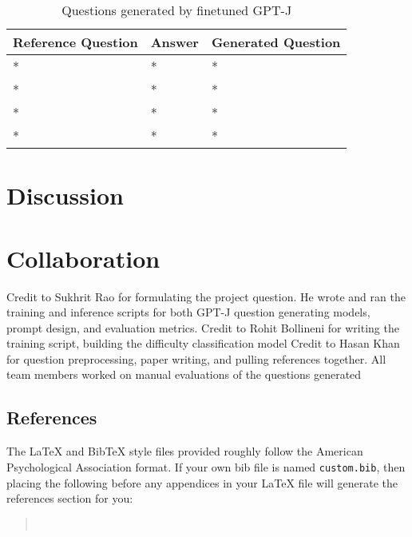 \documentclass[11pt]{article}
\begin{document}
\begin{table*}
\centering
\begin{tabular}{lll}
\hline
\textbf{Reference Question} & \textbf{Answer} & \textbf{Generated Question}\\
\hline
* & * & * \\
\hline
* & * & * \\
\hline
* & * & * \\
\hline
* & * & * \\
\hline
\end{tabular}
\caption{\label{citation-guide}
Questions generated by finetuned GPT-J 
}
\end{table*}

\section{Discussion}

\section{Collaboration}
Credit to Sukhrit Rao for formulating the project question. He wrote and ran the training and inference scripts for both GPT-J question generating models, prompt design, and evaluation metrics.
Credit to Rohit Bollineni for writing the training script, building the difficulty classification model
Credit to Hasan Khan for question preprocessing, paper writing, and pulling references together. All team members worked on manual evaluations of the questions generated 



\subsection{References}

\nocite{Ando2005,borschinger-johnson-2011-particle,andrew2007scalable,rasooli-tetrault-2015,goodman-etal-2016-noise,harper-2014-learning}

The \LaTeX{} and Bib\TeX{} style files provided roughly follow the American Psychological Association format.
If your own bib file is named \texttt{custom.bib}, then placing the following before any appendices in your \LaTeX{} file will generate the references section for you:
\begin{quote}
\begin{verbatim}


\end{verbatim}
\end{quote}
\end{document}
